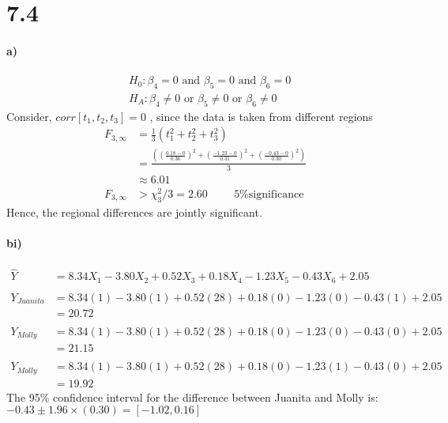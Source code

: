 \documentclass[letterpaper,12pt,titlepage,oneside,final]{book}
\begin{document}
\section*{7.4}
\paragraph{a)}
\begin{align*}
&H_{0} : \beta_{4} = 0 \text{ and } \beta_{5} =0 \text{ and } \beta_{6} = 0\\
&H_{A} : \beta_{4} \neq 0 \text{ or } \beta_{5} \neq 0 \text{ or } \beta_{6} \neq 0
\end{align*}
Consider, $corr[t_1, t_2, t_3] = 0$ , since the data is taken from different regions
\begin{align*}
F_{3,\infty} &= \frac{1}{3} \left( t_1^2 + t_2^2 + t_3^2 \right)\\
&= \frac{ \left( \left( \frac{0.18 - 0}{0.36} \right)^2 + \left( \frac{-1.23 - 0}{0.31} \right)^2 + \left( \frac{-0.43 - 0}{0.30} \right)^2 \right)}{3}\\
&\approx 6.01\\
F_{3,\infty} &> \chi_3^2/3 = 2.60\hspace{1cm}  \text{5\% significance}
\end{align*}
Hence, the regional differences are jointly significant. 

\paragraph{bi)}
\begin{align*}
\widehat{Y} &= 8.34 X_1 -3.80 X_2 + 0.52 X_3 +0.18 X_4 -1.23 X_5  -0.43 X_6 + 2.05\\
\\
Y_{Juanita}& = 8.34 (1) -3.80 (1) + 0.52 (28) +0.18 (0) -1.23 (0)  -0.43 (1) + 2.05\\
&=20.72\\
\\
Y_{Molly}& = 8.34 (1) -3.80 (1) + 0.52 (28) +0.18 (0) -1.23 (0)  -0.43 (0) + 2.05\\
&=21.15\\
\\
Y_{Molly}& = 8.34 (1) -3.80 (1) + 0.52 (28) +0.18 (0) -1.23 (1)  -0.43 (0) + 2.05\\
&=19.92
\end{align*}
The 95\% confidence interval for the difference between Juanita and Molly is:\\
$-0.43 \pm 1.96\times(0.30) = [-1.02, 0.16]$
\end{document}
